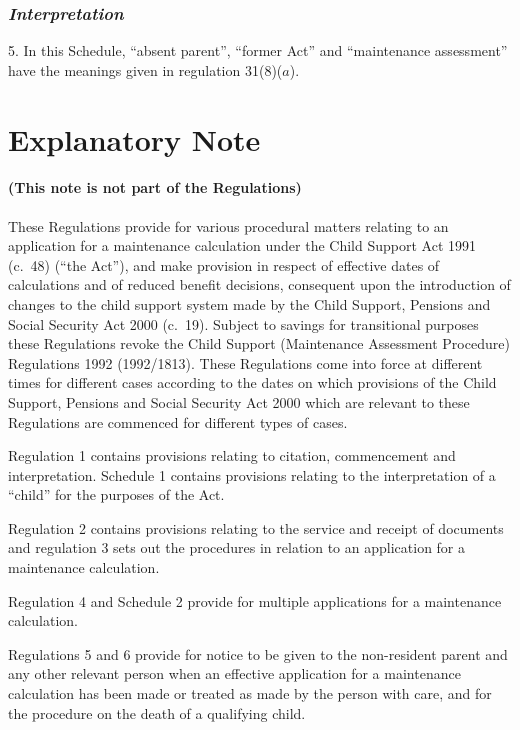 \documentclass[12pt,a4paper]{article}
\begin{document}
\section*{\itshape Interpretation}

5.  In this Schedule, “absent parent”, “former Act” and “maintenance assessment” have the meanings given in regulation 31(8)($a$).

\part{Explanatory Note}

\renewcommand\parthead{— Explanatory Note}

\subsection*{(This note is not part of the Regulations)}

These Regulations provide for various procedural matters relating to an application for a maintenance calculation under the Child Support Act 1991 (c.\ 48) (“the Act”), and make provision in respect of effective dates of calculations and of reduced benefit decisions, consequent upon the introduction of changes to the child support system made by the Child Support, Pensions and Social Security Act 2000 (c.\ 19). Subject to savings for transitional purposes these Regulations revoke the Child Support (Maintenance Assessment Procedure) Regulations 1992 (1992/1813). These Regulations come into force at different times for different cases according to the dates on which provisions of the Child Support, Pensions and Social Security Act 2000 which are relevant to these Regulations are commenced for different types of cases.

Regulation 1 contains provisions relating to citation, commencement and interpretation. Schedule 1 contains provisions relating to the interpretation of a “child” for the purposes of the Act.

Regulation 2 contains provisions relating to the service and receipt of documents and regulation 3 sets out the procedures in relation to an application for a maintenance calculation.

Regulation 4 and Schedule 2 provide for multiple applications for a maintenance calculation.

Regulations 5 and 6 provide for notice to be given to the non-resident parent and any other relevant person when an effective application for a maintenance calculation has been made or treated as made by the person with care, and for the procedure on the death of a qualifying child.
\end{document}
